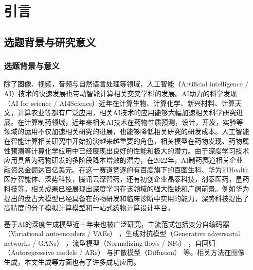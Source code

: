 \titlespacing{\chapter}{0pt}{-50pt}{0pt}
\chapter{引言}
\label{chap:introduction}
\section{选题背景与研究意义}
\subsection{选题背景与意义}
除了图像、视频，音频与自然语言处理等领域，人工智能（Artificial intelligence / AI）技术的快速发展也带动智能计算相关交叉学科的发展。AI助力的科学发现（AI for science / AI4Science）近年在计算生物、计算化学、新兴材料、计算天文，计算农业等都有广泛应用，相关AI技术的应用能够大幅加速相关科学研究进展。在计算制药领域，近年来相关AI技术在药物性质预测，设计，开发，实验等领域的运用不仅加速相关研究的进展，也能够降低相关研究的研发成本。人工智能在智能计算相关研究中开始扮演越来越重要的角色，相关模型在药物发现、药物属性预测等计算化学应用中已经展现出良好的性能和极大的潜力。由于深度学习技术应用具备为药物研发的多阶段降本增效的潜力，在2022年，AI制药赛道相关企业融资总金额达百亿美元。在这一赛道竞逐的有百度旗下的百图生科、华为EIHealth医疗智能体、深势科技，腾讯云深智药，还有初创企业晶泰科技，剂泰医药，星药科技等。相关成果已经展现出深度学习在该领域的强大性能和广阔前景。例如华为提出的盘古大模型已经具备在药物研发和临床诊断中实用的能力，深势科技提出了高精度的分子模拟计算模型和一站式药物计算设计平台。

基于AI的深度生成模型近十年来也被广泛研究，主流范式包括变分自编码器（Variational autoencoders / VAEs） \cite{vae_kingma_13}，生成对抗模型（Generative adversarial networks / GANs） \cite{gan_goodfellow_14}，流型模型（Normalizing flows / NFs） \cite{nice_dinh_15,density_dinh_17}，自回归（Autoregressive models / ARs） \cite{ar_oord_16}与扩散模型（Diffusion） \cite{deepunsupervised_dickstein_15,generative_song_19}等。相关方法在图像生成，本文生成等方面也有了许多成功应用。

